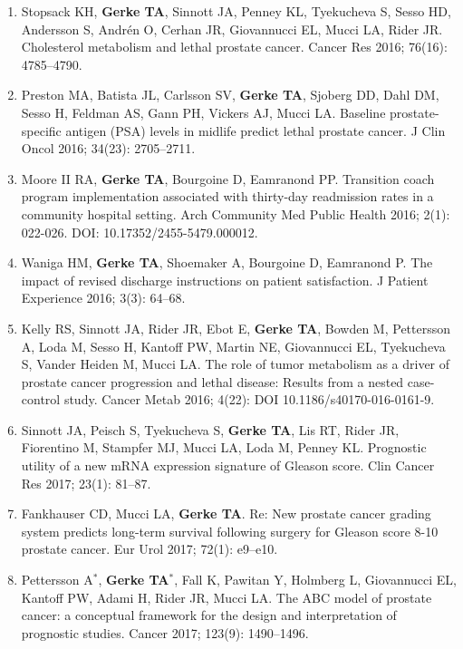 \documentclass[11pt, a4paper]{article} %
\begin{document}
\begin{enumerate}[leftmargin=*]
\item{} Stopsack KH, {\bf Gerke TA}, Sinnott JA, Penney KL, Tyekucheva S, Sesso HD, Andersson S, Andr\'{e}n O, Cerhan JR, Giovannucci EL, Mucci LA, Rider JR. Cholesterol metabolism and lethal prostate cancer. Cancer Res 2016; 76(16): 4785--4790.

\item{} Preston MA, Batista JL, Carlsson SV, {\bf Gerke TA}, Sjoberg DD, Dahl DM, Sesso H, Feldman AS, Gann PH, Vickers AJ, Mucci LA. Baseline prostate-specific antigen (PSA) levels in midlife predict lethal prostate cancer. J Clin Oncol 2016; 34(23): 2705--2711.

\item{} Moore II RA, {\bf Gerke TA}, Bourgoine D, Eamranond PP. Transition coach program implementation associated with thirty-day readmission rates in a community hospital setting. Arch Community Med Public Health 2016; 2(1): 022-026. DOI: 10.17352/2455-5479.000012.

\item{} Waniga HM, {\bf Gerke TA}, Shoemaker A, Bourgoine D, Eamranond P. The impact of revised discharge instructions on patient satisfaction. J Patient Experience 2016; 3(3): 64--68. 

\item{} Kelly RS, Sinnott JA, Rider JR, Ebot E, {\bf Gerke TA}, Bowden M, Pettersson A, Loda M, Sesso H, Kantoff PW, Martin NE, Giovannucci EL, Tyekucheva S, Vander Heiden M, Mucci LA. The role of tumor metabolism as a driver of prostate cancer progression and lethal disease: Results from a nested case-control study. Cancer Metab 2016; 4(22): DOI 10.1186/s40170-016-0161-9.

\item{} Sinnott JA, Peisch S, Tyekucheva S, {\bf Gerke TA}, Lis RT, Rider JR, Fiorentino M, Stampfer MJ, Mucci LA, Loda M, Penney KL. Prognostic utility of a new mRNA expression signature of Gleason score. Clin Cancer Res 2017; 23(1): 81--87. 

\item{} Fankhauser CD, Mucci LA, {\bf Gerke TA}. Re: New prostate cancer grading system predicts long-term survival following surgery for Gleason score 8-10 prostate cancer. Eur Urol 2017; 72(1): e9--e10.

\item{} Pettersson A$^*$, {\bf Gerke TA$^*$}, Fall K, Pawitan Y, Holmberg L, Giovannucci EL, Kantoff PW, Adami H, Rider JR, Mucci LA. The ABC model of prostate cancer: a conceptual framework for the design and interpretation of prognostic studies. Cancer 2017; 123(9): 1490--1496.


\end{enumerate}
\end{document}
